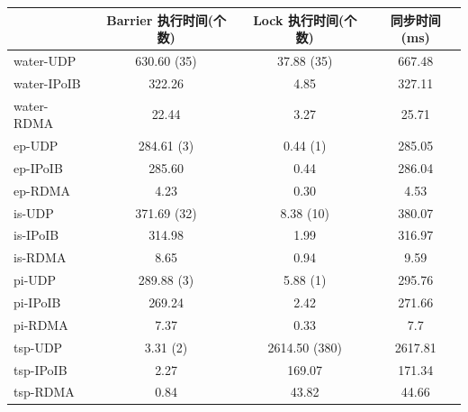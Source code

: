 {    \begin{table}
        \footnotesize%
        \setlength{\tabcolsep}{4pt}%
        \renewcommand{\arraystretch}{1.5}%
        \centering
        \label{tab:type1-time}
        \begin{tabular}{l|c|c|c}
            \hline
                        & Barrier 执行时间(个数) & Lock 执行时间(个数) & 同步时间(ms) \\
            \hline
            water-UDP   & 630.60 (35)      & 37.88 (35)    & 667.48   \\
            water-IPoIB & 322.26           & 4.85          & 327.11   \\
            water-RDMA  & 22.44            & 3.27          & 25.71    \\
            \hline
            ep-UDP      & 284.61 (3)       & 0.44 (1)      & 285.05   \\
            ep-IPoIB    & 285.60           & 0.44          & 286.04   \\
            ep-RDMA     & 4.23             & 0.30          & 4.53     \\
            \hline
            is-UDP      & 371.69 (32)      & 8.38 (10)     & 380.07   \\
            is-IPoIB    & 314.98           & 1.99          & 316.97   \\
            is-RDMA     & 8.65             & 0.94          & 9.59     \\
            \hline
            pi-UDP      & 289.88 (3)       & 5.88 (1)      & 295.76   \\
            pi-IPoIB    & 269.24           & 2.42          & 271.66   \\
            pi-RDMA     & 7.37             & 0.33          & 7.7      \\
            \hline
            tsp-UDP     & 3.31 (2)         & 2614.50 (380) & 2617.81  \\
            tsp-IPoIB   & 2.27             & 169.07        & 171.34   \\
            tsp-RDMA    & 0.84             & 43.82         & 44.66    \\
            \hline
        \end{tabular}
    \end{table}

}
